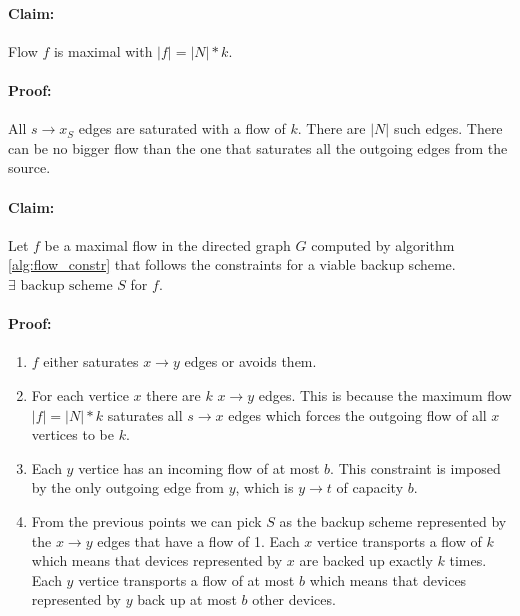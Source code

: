 \paragraph{Claim:} Flow $f$ is maximal with $|f| = |N| * k$.
\paragraph{Proof:} All $s \rightarrow x_S$ edges are saturated with a flow of $k$. There are $|N|$ such edges. There can be no bigger flow than the one that saturates all the outgoing edges from the source.

\paragraph{Claim:} Let $f$ be a maximal flow in the directed graph $G$ computed by algorithm \ref{alg:flow_constr} that follows the constraints for a viable backup scheme. $\exists{ \text{ backup scheme } S}$ for $f$.
\paragraph{Proof:} 
\begin{enumerate}
	\item $f$ either saturates $x \rightarrow y$ edges or avoids them.
	
	\item For each vertice $x$ there are $k$ $x \rightarrow y$ edges. This is because the maximum flow $|f| = |N| * k$ saturates all $s \rightarrow x$ edges which forces the outgoing flow of all $x$ vertices to be $k$. 
	
	\item Each $y$ vertice has an incoming flow of at most $b$. This constraint is imposed by the only outgoing edge from $y$, which is $y \rightarrow t$ of capacity $b$. 
	
	\item From the previous points we can pick $S$ as the backup scheme represented by the $x \rightarrow y$ edges that have a flow of 1. Each $x$ vertice transports a flow of $k$ which means that devices represented by $x$ are backed up exactly $k$ times. Each $y$ vertice transports a flow of at most $b$ which means that devices represented by $y$ back up at most $b$ other devices.
\end{enumerate}




